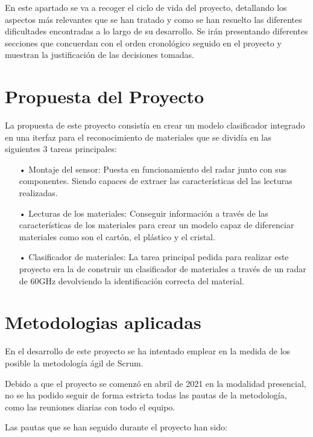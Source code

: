 
En este apartado se va a recoger el ciclo de vida del proyecto, detallando los aspectos más relevantes que se han tratado y como se han resuelto las diferentes dificultades encontradas a lo largo de su desarrollo. Se irán presentando diferentes secciones que concuerdan con el orden cronológico seguido en el proyecto y muestran la justificación de las decisiones tomadas.

\section{Propuesta del Proyecto}

La propuesta de este proyecto consistía en crear un modelo clasificador integrado en una iterfaz para el reconocimiento de materiales que se dividía en las siguientes 3 tareas principales:

\begin{itemize}
\item[•] Montaje del sensor: Puesta en funcionamiento del radar junto con sus componentes. Siendo capaces de extraer las características del las lecturas realizadas.

\item[•] Lecturas de los materiales: Conseguir información a través de las características de los materiales para crear un modelo capaz de diferenciar materiales como son el cartón, el plástico y el cristal.

\item[•] Clasificador de materiales: La tarea principal pedida para realizar este proyecto era la de construir un clasificador de materiales a través de un radar de 60GHz devolviendo la identificación correcta del material.
\end{itemize}

\section{Metodologias aplicadas}

En el desarrollo de este proyecto se ha intentado emplear en la medida de los posible la metodología ágil de Scrum.

Debido a que el proyecto se comenzó en abril de 2021 en la modalidad presencial, no se ha podido seguir de forma estricta todas las pautas de la metodología, como las reuniones diarias con todo el equipo. 

Las pautas que se han seguido durante el proyecto han sido:

